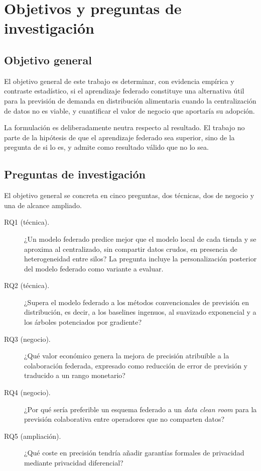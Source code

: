 \chapter{Objetivos y preguntas de investigación}
\label{cap:objetivos}

\section{Objetivo general}

El objetivo general de este trabajo es determinar, con evidencia empírica y contraste estadístico,
si el aprendizaje federado constituye una alternativa útil para la previsión de demanda en
distribución alimentaria cuando la centralización de datos no es viable, y cuantificar el valor de
negocio que aportaría su adopción.

La formulación es deliberadamente neutra respecto al resultado. El trabajo no parte de la hipótesis
de que el aprendizaje federado sea superior, sino de la pregunta de si lo es, y admite como
resultado válido que no lo sea.

\section{Preguntas de investigación}

El objetivo general se concreta en cinco preguntas, dos técnicas, dos de negocio y una de alcance
ampliado.

\begin{description}
  \item[RQ1 (técnica).] ¿Un modelo federado predice mejor que el modelo local de cada tienda y se
    aproxima al centralizado, sin compartir datos crudos, en presencia de heterogeneidad entre
    silos? La pregunta incluye la personalización posterior del modelo federado como variante a
    evaluar.

  \item[RQ2 (técnica).] ¿Supera el modelo federado a los métodos convencionales de previsión en
    distribución, es decir, a los baselines ingenuos, al suavizado exponencial y a los árboles
    potenciados por gradiente?

  \item[RQ3 (negocio).] ¿Qué valor económico genera la mejora de precisión atribuible a la
    colaboración federada, expresado como reducción de error de previsión y traducido a un rango
    monetario?

  \item[RQ4 (negocio).] ¿Por qué sería preferible un esquema federado a un \emph{data clean room}
    para la previsión colaborativa entre operadores que no comparten datos?

  \item[RQ5 (ampliación).] ¿Qué coste en precisión tendría añadir garantías formales de privacidad
    mediante privacidad diferencial?
\end{description}

